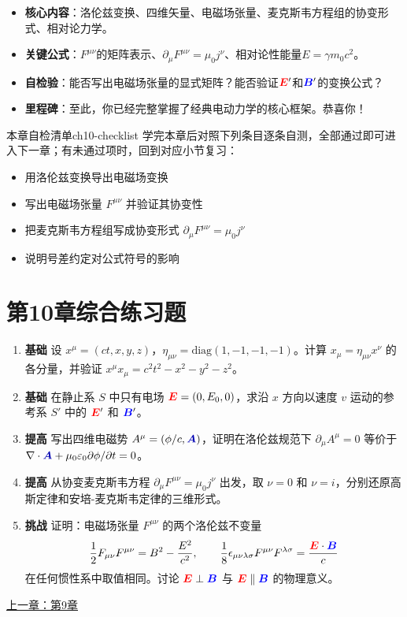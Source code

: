 \documentclass[11pt,a4paper,openany,oneside]{book}
\newcommand{\vecE}{\textcolor{red}{\vect{E}}}
\newcommand{\vecB}{\textcolor{blue}{\vect{B}}}
\newcommand{\vecA}{\textcolor{blue!70!black}{\vect{A}}}
\newcommand{\eps}{\varepsilon}
\newcommand{\muz}{\mu_0}
\newcommand{\vect}[1]{\bm{#1}}
\begin{document}
\begin{chapterreview}
\begin{itemize}[nosep]
\item \textbf{核心内容}：洛伦兹变换、四维矢量、电磁场张量、麦克斯韦方程组的协变形式、相对论力学。
\item \textbf{关键公式}：$F^{\mu\nu}$的矩阵表示、$\partial_\mu F^{\mu\nu} = \mu_0 j^\nu$、相对论性能量$E = \gamma m_0c^2$。
\item \textbf{自检验}：能否写出电磁场张量的显式矩阵？能否验证$\vecE'$和$\vecB'$的变换公式？
\item \textbf{里程碑}：至此，你已经完整掌握了经典电动力学的核心框架。恭喜你！
\end{itemize}
\end{chapterreview}

\begin{tip}{本章自检清单}{ch10-checklist}
学完本章后对照下列条目逐条自测，全部通过即可进入下一章；有未通过项时，回到对应小节复习：
\begin{itemize}[label=$\square$, nosep]
\item 用洛伦兹变换导出电磁场变换
\item 写出电磁场张量 $F^{\mu\nu}$ 并验证其协变性
\item 把麦克斯韦方程组写成协变形式 $\partial_\mu F^{\mu\nu} = \muz j^\nu$
\item 说明号差约定对公式符号的影响
\end{itemize}
\end{tip}

\section*{第10章综合练习题}
\begin{enumerate}[label=\textbf{\arabic*.}]
\item \textbf{基础} 设 $x^\mu=(ct,x,y,z)$，$\eta_{\mu\nu}=\text{diag}(1,-1,-1,-1)$。计算 $x_\mu=\eta_{\mu\nu}x^\nu$ 的各分量，并验证 $x^\mu x_\mu=c^2t^2-x^2-y^2-z^2$。
\item \textbf{基础} 在静止系 $S$ 中只有电场 $\vecE=(0,E_0,0)$，求沿 $x$ 方向以速度 $v$ 运动的参考系 $S'$ 中的 $\vecE'$ 和 $\vecB'$。
\item \textbf{提高} 写出四维电磁势 $A^\mu=(\phi/c,\vecA)$，证明在洛伦兹规范下 $\partial_\mu A^\mu=0$ 等价于 $\nabla\cdot\vecA+\muz\eps_0\partial\phi/\partial t=0$。
\item \textbf{提高} 从协变麦克斯韦方程 $\partial_\mu F^{\mu\nu}=\muz j^\nu$ 出发，取 $\nu=0$ 和 $\nu=i$，分别还原高斯定律和安培-麦克斯韦定律的三维形式。
\item \textbf{挑战} 证明：电磁场张量 $F^{\mu\nu}$ 的两个洛伦兹不变量
\[
\frac{1}{2}F_{\mu\nu}F^{\mu\nu}=B^2-\frac{E^2}{c^2}, \qquad \frac{1}{8}\epsilon_{\mu\nu\lambda\sigma}F^{\mu\nu}F^{\lambda\sigma}=\frac{\vecE\cdot\vecB}{c}
\]
在任何惯性系中取值相同。讨论 $\vecE\perp\vecB$ 与 $\vecE\parallel\vecB$ 的物理意义。
\end{enumerate}
\newpage
\begin{center}\small \hyperlink{ch9-goal}{上一章：第9章}\end{center}
\end{document}
